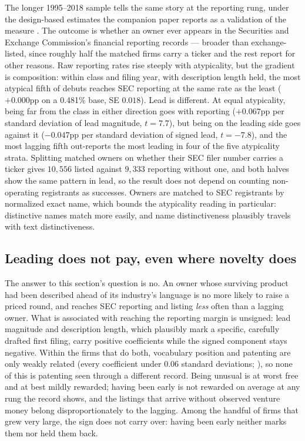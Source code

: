 The longer 1995--2018 sample tells the same story at the reporting rung,
under the design-based estimates the companion paper reports as a
validation of the measure \citep{SilverCorpus2026}. The outcome is
whether an owner ever appears in the Securities and Exchange Commission's
financial reporting records --- broader than exchange-listed, since
roughly half the matched firms carry a ticker and the rest report for
other reasons. Raw reporting rates rise steeply with atypicality, but the
gradient is composition: within class and filing year, with description
length held, the most atypical fifth of debuts reaches SEC reporting at
the same rate as the least ($+0.000$pp on a 0.481\% base, SE $0.018$).
Lead is different. At equal atypicality, being far from the class in
either direction goes with reporting ($+0.067$pp per standard deviation
of lead magnitude, $t = 7.7$), but being on the leading side goes
against it ($-0.047$pp per standard deviation of signed lead,
$t = -7.8$), and the most lagging fifth out-reports the most leading in
four of the five atypicality strata. Splitting matched owners on whether
their SEC filer number carries a ticker gives $10{,}556$ listed against
$9{,}333$ reporting without one, and both halves show the same pattern in
lead, so the result does not depend on counting non-operating
registrants as successes. Owners are matched to SEC registrants by
normalized exact name, which bounds the atypicality reading in
particular: distinctive names match more easily, and name
distinctiveness plausibly travels with text distinctiveness.

\subsection{Leading does not pay, even where novelty does}\label{sec:success_conclusion}

The answer to this section's question is no. An owner whose surviving
product had been described ahead of its industry's language is no more
likely to raise a priced round, and reaches SEC reporting and listing
\emph{less} often than a lagging owner. What is associated with reaching
the reporting margin is unsigned: lead magnitude and description length,
which plausibly mark a specific, carefully drafted first filing, carry
positive coefficients while the signed component stays negative. Within
the firms that do both, vocabulary position and patenting are only
weakly related (every coefficient under $0.06$ standard deviations;
\citealp{SilverCorpus2026}), so none of this is patenting seen through a
different record. Being unusual is at worst free and at best mildly
rewarded; having been early is not rewarded on average at any rung the
record shows, and the listings that arrive without observed venture
money belong disproportionately to the lagging. Among the handful of
firms that grew very large, the sign does not carry over: having been
early neither marks them nor held them back.
